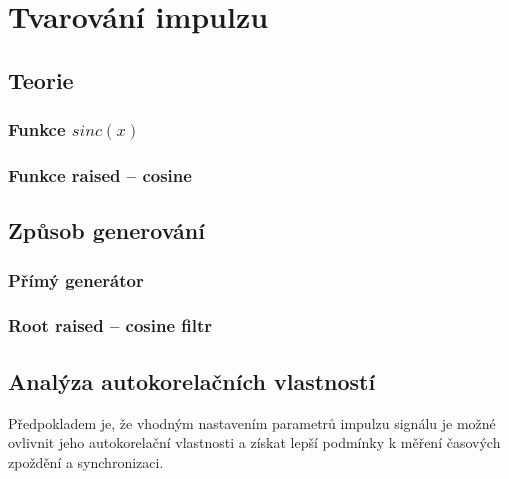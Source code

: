 \section{Tvarování impulzu}




\subsection{Teorie}

\subsubsection {Funkce $sinc(x)$}

\subsubsection {Funkce raised -- cosine}


\subsection{Způsob generování}

\subsubsection {Přímý generátor}

\subsubsection {Root raised -- cosine filtr}

\subsection{Analýza autokorelačních vlastností}

\marginpar{\textcolor{txt_blue}{Hlavní myšlenka analýzy}}
Předpokladem je, že vhodným nastavením parametrů impulzu signálu je možné ovlivnit jeho autokorelační vlastnosti a získat lepší podmínky k měření časových zpoždění a synchronizaci.


